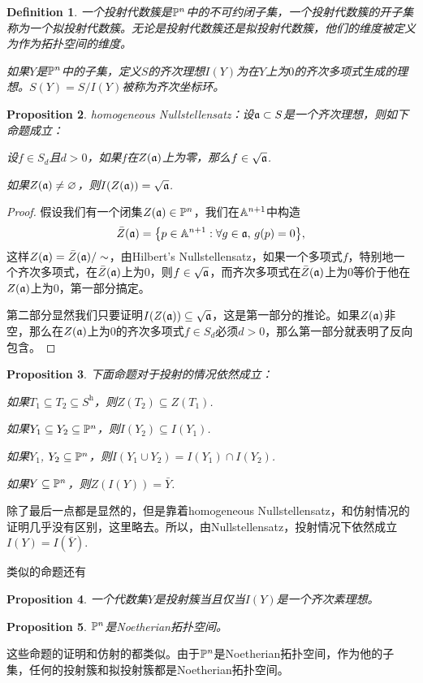 \documentclass[9pt]{extarticle}
\theoremstyle{plain}%
\newtheorem{defi}{Definition}[section]%
\newtheorem{pro}[defi]{Proposition}%
\begin{document}
\begin{defi}
	一个投射代数簇是$\mathbb{P}^n$中的不可约闭子集，一个投射代数簇的开子集称为一个拟投射代数簇。无论是投射代数簇还是拟投射代数簇，他们的维度被定义为作为拓扑空间的维度。

	如果$Y$是$\mathbb{P}^n$中的子集，定义$S$的齐次理想$I(Y)$为在$Y$上为$0$的齐次多项式生成的理想。$S(Y)=S/I(Y)$被称为齐次坐标环。
\end{defi}

\begin{pro}
homogeneous Nullstellensatz：设$\mathfrak{a}\subset S$是一个齐次理想，则如下命题成立：

 设$f\in S_d$且$d>0$，如果$f$在$Z(\mathfrak{a})$上为零，那么$f \in \sqrt{\mathfrak{a}}$.

 如果$Z(\mathfrak{a})\neq \varnothing$，则$I(Z(\mathfrak{a}))=\sqrt{\mathfrak{a}}$.
\end{pro}
\begin{proof}
	假设我们有一个闭集$Z(\mathfrak{a})\in \mathbb{P}^n$，我们在$\mathbb{A}^{n+1}$中构造
	\[
		\bar{Z}(\mathfrak{a})=\bigl\{p\in \mathbb{A}^{n+1}:\forall g\in \mathfrak{a},\, g(p)=0\bigr\},
	\]
	这样$Z(\mathfrak{a})=\bar{Z}(\mathfrak{a})/\sim$，由Hilbert's Nullstellensatz，如果一个多项式$f$，特别地一个齐次多项式，在$\bar{Z}(\mathfrak{a})$上为$0$，则$f\in \sqrt{\mathfrak{a}}$，而齐次多项式在$\bar{Z}(\mathfrak{a})$上为$0$等价于他在$Z(\mathfrak{a})$上为$0$，第一部分搞定。

	第二部分显然我们只要证明$I(Z(\mathfrak{a}))\subseteq \sqrt{\mathfrak{a}}$，这是第一部分的推论。如果$Z(\mathfrak{a})$非空，那么在$Z(\mathfrak{a})$上为$0$的齐次多项式$f\in S_d$必须$d>0$，那么第一部分就表明了反向包含。
\end{proof}

\begin{pro}
	下面命题对于投射的情况依然成立：

	 如果$T_1\subseteq T_2 \subseteq S^{\mathrm{h}}$，则$Z(T_2)\subseteq Z(T_1)$.

	 如果$Y_1\subseteq Y_2 \subseteq \mathbb{P}^n$，则$I(Y_2)\subseteq I(Y_1)$.

	 如果$Y_1$, $Y_2 \subseteq \mathbb{P}^n$，则$I(Y_1\cup Y_2)=I(Y_1)\cap I(Y_2)$.

	 如果$Y \subseteq \mathbb{P}^n$，则$Z(I(Y))=\bar{Y}$.
\end{pro}
除了最后一点都是显然的，但是靠着homogeneous Nullstellensatz，和仿射情况的证明几乎没有区别，这里略去。所以，由Nullstellensatz，投射情况下依然成立$I(Y)=I(\bar{Y})$.

类似的命题还有
\begin{pro}
	一个代数集$Y$是投射簇当且仅当$I(Y)$是一个齐次素理想。
\end{pro}
\begin{pro}
	$\mathbb{P}^n$是Noetherian拓扑空间。
\end{pro}
这些命题的证明和仿射的都类似。由于$\mathbb{P}^n$是Noetherian拓扑空间，作为他的子集，任何的投射簇和拟投射簇都是Noetherian拓扑空间。
\end{document}

